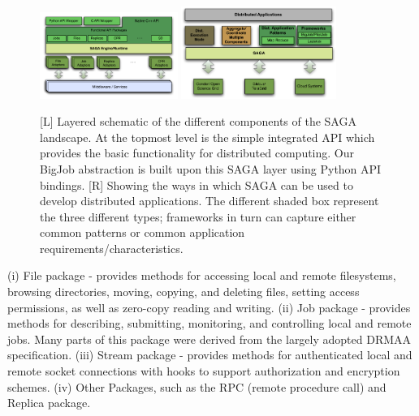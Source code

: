 \documentclass{rspublic}
\begin{document}
\begin{figure}[!ht]
 \begin{center}
     \includegraphics[width=0.40\textwidth]{stci_saga_figures-1.pdf}
    \includegraphics[width=0.45\textwidth]{distributed_applications_saga_figure.pdf}
\end{center}
\caption{\small [L] Layered schematic of the different components of
  the SAGA landscape. At the topmost level is the simple integrated
  API which provides the basic functionality for distributed
  computing. Our BigJob abstraction is built upon this SAGA layer
  using Python API bindings. [R] Showing the ways in which SAGA can be
  used to develop distributed applications.  The different shaded box
  represent the three different types; frameworks in turn can capture
  either common patterns or common application
  requirements/characteristics.} \label{Fig:SAGA1}
\end{figure}

(i) File package - provides methods for accessing local and remote
filesystems, browsing directories, moving, copying, and deleting
files, setting access permissions, as well as zero-copy reading and
writing.  (ii) Job package - provides methods for describing,
submitting, monitoring, and controlling local and remote jobs. Many
parts of this package were derived from the largely adopted DRMAA
specification.  (iii) Stream package - provides methods for
authenticated local and remote socket connections with hooks to
support authorization and encryption schemes.  (iv) Other Packages,
such as the RPC (remote procedure call) and Replica package.
\end{document}
